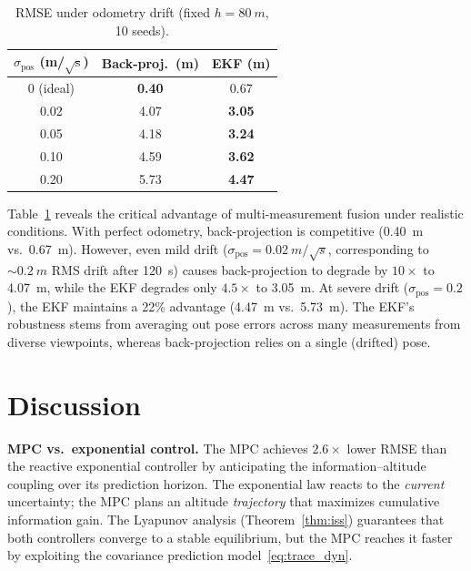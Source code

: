 \documentclass[journal]{IEEEtran}
\begin{document}
\begin{table}[t]
\centering
\caption{RMSE under odometry drift (fixed $h{=}\SI{80}{m}$, 10 seeds).}
\label{tab:drift}
\begin{tabular}{@{}ccc@{}}
\toprule
$\sigma_{\text{pos}}$ \textbf{(m/$\sqrt{\text{s}}$)} & \textbf{Back-proj.\ (m)} & \textbf{EKF (m)} \\
\midrule
0 (ideal)  & \textbf{0.40} & 0.67 \\
0.02       & 4.07 & \textbf{3.05} \\
0.05       & 4.18 & \textbf{3.24} \\
0.10       & 4.59 & \textbf{3.62} \\
0.20       & 5.73 & \textbf{4.47} \\
\bottomrule
\end{tabular}
\end{table}

Table~\ref{tab:drift} reveals the critical advantage of multi-measurement fusion under realistic conditions.
With perfect odometry, back-projection is competitive (\SI{0.40}{m} vs.\ \SI{0.67}{m}).
However, even mild drift ($\sigma_{\text{pos}} = \SI{0.02}{m/\sqrt{s}}$, corresponding to ${\sim}\SI{0.2}{m}$ RMS drift after \SI{120}{s}) causes back-projection to degrade by $10\times$ to \SI{4.07}{m}, while the EKF degrades only $4.5\times$ to \SI{3.05}{m}.
At severe drift ($\sigma_{\text{pos}} = 0.2$), the EKF maintains a 22\% advantage (\SI{4.47}{m} vs.\ \SI{5.73}{m}).
The EKF's robustness stems from averaging out pose errors across many measurements from diverse viewpoints, whereas back-projection relies on a single (drifted) pose.

\section{Discussion}

\textbf{MPC vs.\ exponential control.}
The MPC achieves $2.6\times$ lower RMSE than the reactive exponential controller by anticipating the information--altitude coupling over its prediction horizon.
The exponential law reacts to the \emph{current} uncertainty; the MPC plans an altitude \emph{trajectory} that maximizes cumulative information gain.
The Lyapunov analysis (Theorem~\ref{thm:iss}) guarantees that both controllers converge to a stable equilibrium, but the MPC reaches it faster by exploiting the covariance prediction model~\eqref{eq:trace_dyn}.
\end{document}
